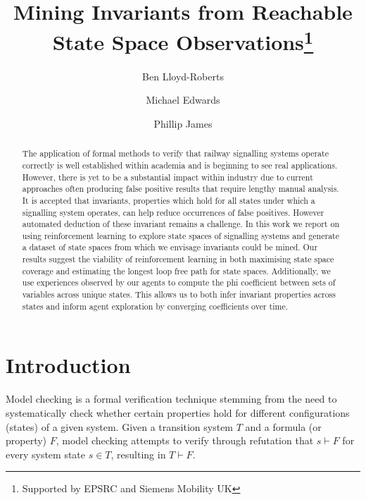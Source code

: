 \documentclass[runningheads]{llncs}
\begin{document}
%
\title{Mining Invariants from Reachable State Space Observations\thanks{Supported by EPSRC and Siemens Mobility UK}}
%
%
\author{Ben Lloyd-Roberts \and
Michael Edwards \and {Phillip James}}
%
%
%
\maketitle              %
%
\begin{abstract}
The application of formal methods to verify that railway signalling systems operate correctly is well established within academia and is beginning to see real applications. However, there is yet to be a substantial impact within industry due to current approaches often producing false positive results that require lengthy manual analysis. It is accepted that invariants, properties which hold for all states under which a signalling system operates, can help reduce occurrences of false positives. However automated deduction of these invariant remains a challenge. In this work we report on using reinforcement learning to explore state spaces of signalling systems and generate a dataset of state spaces from which we envisage invariants could be mined. Our results suggest the viability of reinforcement learning in both maximising state space coverage and estimating the longest loop free path for state spaces. Additionally, we use experiences observed by our agents to compute the phi coefficient between sets of variables across unique states. This allows us to both infer invariant properties across states and inform agent exploration by converging coefficients over time.

\end{abstract}
%
%
%
\section{Introduction}
Model checking is a formal verification technique stemming from the need to systematically
check whether certain properties hold for different configurations (states) of a given system.
Given a transition system $T$ and a formula (or property) $F$, model checking attempts to verify through refutation that $s \vdash F$ for every system state $s \in T$, resulting in $T \vdash F$. 
\end{document}
